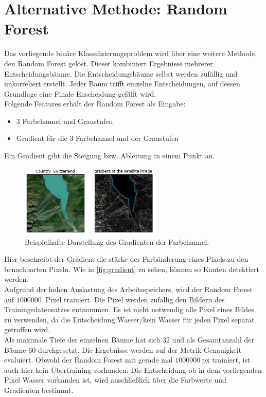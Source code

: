 \section{Alternative Methode: Random Forest}
\label{sec:Alternativ}
Das vorliegende binäre Klassifizierungsproblem wird über eine weitere Methode, den Random Forest gelöst.
Dieser kombiniert Ergebnisse mehrerer Entscheidungsbäume.
Die Entscheidungsbäume selbst werden zufällig und unkorreliert erstellt.
Jeder Baum trifft einzelne Entscheidungen, auf dessen Grundlage eine Finale Enscheidung gefällt wird.
\\
Folgende Features erhält der Random Forest als Eingabe:
\begin{itemize}
    \setlength\itemsep{0.1em}
    \item 3 Farbchannel und Graustufen
    \item Gradient für die 3 Farbchannel und der Graustufen
\end{itemize}
Ein Gradient gibt die Steigung bzw. Ableitung in einem Punkt an.
\begin{figure}
    \centering
    \includegraphics[width=0.6\textwidth]{content/img/gradient.png}
    \caption{Beispielhafte Darstellung des Gradienten der Farbchannel.\cite{mapbox}\cite{openstreetmap}}
    \label{fig:gradient}
\end{figure}
Hier beschreibt der Gradient die stärke der Farbänderung eines Pixels zu den benachbarten Pixeln.
Wie in \autoref{fig:gradient} zu sehen, können so Kanten detektiert werden.
\\
Aufgrund der hohen Auslastung des Arbeitsspeichers, wird der Random Forest auf $\SI{1000000}{}$ Pixel trainiert.
Die Pixel werden zufällig den Bildern des Trainingsdatensatzes entnommen.
Es ist nicht notwendig alle Pixel eines Bildes zu verwenden, da die Entscheidung Wasser/kein Wasser für jeden Pixel separat getroffen wird.
\\
Als maximale Tiefe der einzelnen Bäume hat sich $32$ und als Gesamtanzahl der Bäume $60$ durchgesetzt.
Die Ergebnisse werden auf der Metrik Genauigkeit evaluiert.
Obwohl der Random Forest mit gerade mal $\SI{1000000}{\text{px}}$ trainiert, ist auch hier kein Übertraining vorhanden.
Die Entscheidung ob in dem vorliegenden Pixel Wasser vorhanden ist, wird auschließlich über die Farbwerte und Gradienten bestimmt.
\FloatBarrier